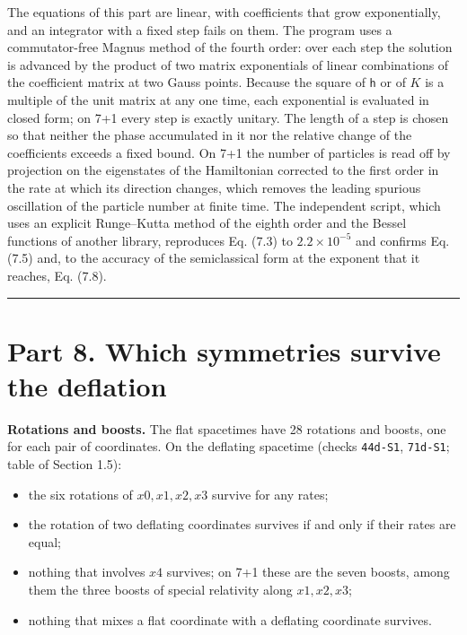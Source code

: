 \documentclass[
  10pt,
]{article}
\providecommand{\tightlist}{%
  \setlength{\itemsep}{0pt}\setlength{\parskip}{0pt}}
\begin{document}
The equations of this part are linear, with coefficients that grow
exponentially, and an integrator with a fixed step fails on them. The
program uses a commutator-free Magnus method of the fourth order: over
each step the solution is advanced by the product of two matrix
exponentials of linear combinations of the coefficient matrix at two
Gauss points. Because the square of \(\mathsf h\) or of \(K\) is a
multiple of the unit matrix at any one time, each exponential is
evaluated in closed form; on 7+1 every step is exactly unitary. The
length of a step is chosen so that neither the phase accumulated in it
nor the relative change of the coefficients exceeds a fixed bound. On
7+1 the number of particles is read off by projection on the eigenstates
of the Hamiltonian corrected to the first order in the rate at which its
direction changes, which removes the leading spurious oscillation of the
particle number at finite time. The independent script, which uses an
explicit Runge--Kutta method of the eighth order and the Bessel
functions of another library, reproduces Eq. (7.3) to
\(2.2\times10^{-5}\) and confirms Eq. (7.5) and, to the accuracy of the
semiclassical form at the exponent that it reaches, Eq. (7.8).

\begin{center}\rule{0.5\linewidth}{0.5pt}\end{center}

\hypertarget{part-8.-which-symmetries-survive-the-deflation}{%
\section{Part 8. Which symmetries survive the
deflation}\label{part-8.-which-symmetries-survive-the-deflation}}

\textbf{Rotations and boosts.} The flat spacetimes have 28 rotations and
boosts, one for each pair of coordinates. On the deflating spacetime
(checks \texttt{44d-S1}, \texttt{71d-S1}; table of Section 1.5):

\begin{itemize}
\tightlist
\item
  the six rotations of \(x0,x1,x2,x3\) survive for any rates;
\item
  the rotation of two deflating coordinates survives if and only if
  their rates are equal;
\item
  nothing that involves \(x4\) survives; on 7+1 these are the seven
  boosts, among them the three boosts of special relativity along
  \(x1,x2,x3\);
\item
  nothing that mixes a flat coordinate with a deflating coordinate
  survives.
\end{itemize}
\end{document}
